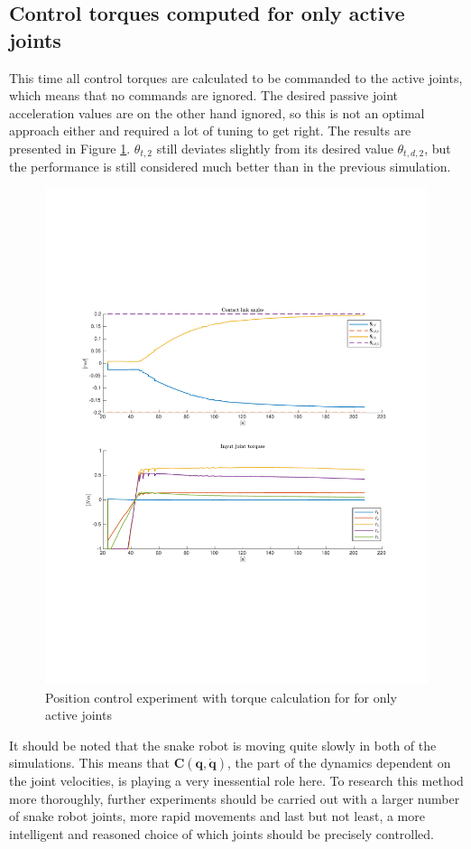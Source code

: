 \subsection{Control torques computed for only active joints}

This time all control torques are calculated to be commanded to the active joints, which means that no commands are ignored. The desired passive joint acceleration values are on the other hand ignored, so this is not an optimal approach either and required a lot of tuning to get right. The results are presented in Figure \ref{fig:2xp-2}. $\theta_{t,2}$ still deviates slightly from its desired value $\theta_{t,d,2}$, but the performance is still considered much better than in the previous simulation.

\begin{figure}[H]
    \centering
    \includegraphics[trim=2.1cm 6cm 2.1cm 6cm, clip=true, width=\textwidth]{figures/experiments/2xpos/2xpos-2plot.pdf}
    \caption{Position control experiment with torque calculation for for only active joints}
    \label{fig:2xp-2}
\end{figure}

It should be noted that the snake robot is moving quite slowly in both of the simulations. This means that $\mathbf{C(q,\dot{q})}$, the part of the dynamics dependent on the joint velocities, is playing a very inessential role here. To research this method more thoroughly, further experiments should be carried out with a larger number of snake robot joints, more rapid movements and last but not least, a more intelligent and reasoned choice of which joints should be precisely controlled.